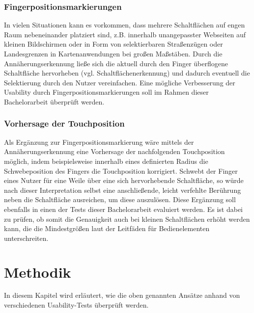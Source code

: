 \documentclass[a4paper,12pt,bibliography=totoc]{scrreprt}%
\begin{document}
\subsection{Fingerpositionsmarkierungen}
In vielen Situationen kann es vorkommen, dass mehrere Schaltflächen auf engen Raum nebeneinander platziert sind, z.B. innerhalb unangepasster Webseiten auf kleinen Bildschirmen oder in Form von selektierbaren Straßenzügen oder Landesgrenzen in Kartenanwendungen bei großen Maßstäben. Durch die Annäherungserkennung ließe sich die aktuell durch den Finger überflogene Schaltfläche hervorheben (vgl. Schaltflächenerkennung) und dadurch eventuell die Selektierung durch den Nutzer vereinfachen. Eine mögliche Verbesserung der Usability durch Fingerpositionsmarkierungen soll im Rahmen dieser Bachelorarbeit überprüft werden.

\subsection{Vorhersage der Touchposition}
Als Ergänzung zur Fingerpositionsmarkierung wäre mittels der Annäherungserkennung eine Vorhersage der nachfolgenden Touchposition möglich, indem beispielsweise innerhalb eines definierten Radius die Schwebeposition des Fingers die Touchposition korrigiert. Schwebt der Finger eines Nutzer für eine Weile über eine sich hervorhebende Schaltfläche, so würde nach dieser Interpretation selbst eine anschließende, leicht verfehlte Berührung neben die Schaltfläche ausreichen, um diese auszulösen. Diese Ergänzung soll ebenfalls in einen der Tests dieser Bachelorarbeit evaluiert werden. Es ist dabei zu prüfen, ob somit die Genauigkeit auch bei kleinen Schaltflächen erhöht werden kann, die die Mindestgrößen laut der Leitfäden für Bedienelementen unterschreiten.

\chapter{Methodik}
In diesem Kapitel wird erläutert, wie die oben genannten Ansätze anhand von verschiedenen Usability-Tests überprüft werden.
\end{document}

